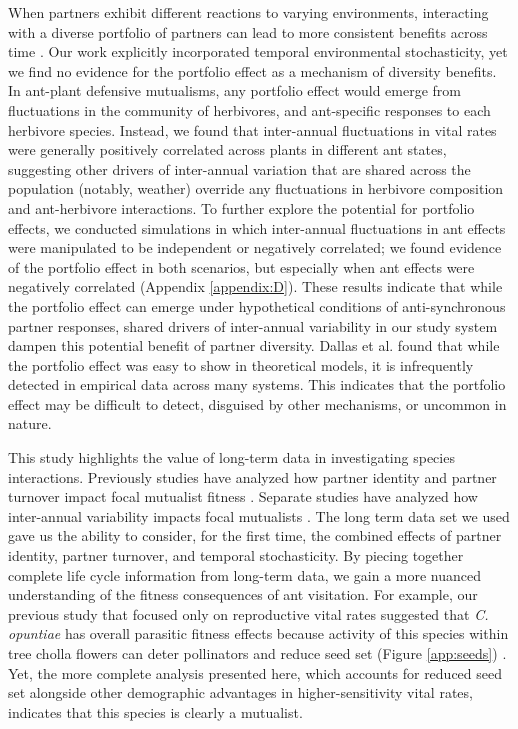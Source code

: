 \documentclass[11pt]{article}
\begin{document}
When partners exhibit different reactions to varying environments, interacting with a diverse portfolio of partners can lead to more consistent benefits across time \citep{Batstone2018}.
Our work explicitly incorporated temporal environmental stochasticity, yet we find no evidence for the portfolio effect as a mechanism of diversity benefits. 
In ant-plant defensive mutualisms, any portfolio effect would emerge from fluctuations in the community of herbivores, and ant-specific responses to each herbivore species. 
Instead, we found that inter-annual fluctuations in vital rates were generally positively correlated across plants in different ant states, suggesting other drivers of inter-annual variation that are shared across the population (notably, weather) override any fluctuations in herbivore composition and ant-herbivore interactions. 
To further explore the potential for portfolio effects, we conducted simulations in which inter-annual fluctuations in ant effects were manipulated to be independent or negatively correlated; we found evidence of the portfolio effect in both scenarios, but especially when ant effects were negatively correlated (Appendix \ref{appendix:D}).
These results indicate that while the portfolio effect can emerge under hypothetical conditions of anti-synchronous partner responses, shared drivers of inter-annual variability in our study system dampen this potential benefit of partner diversity. 
Dallas et al. \citeyear{dallas2022temporal} found that while the portfolio effect was easy to show in theoretical models, it is infrequently detected in empirical data across many systems. 
This indicates that the portfolio effect may be difficult to detect, disguised by other mechanisms, or uncommon in nature. 

This study highlights the value of long-term data in investigating species interactions. 
Previously studies have analyzed how partner identity and partner turnover impact focal mutualist fitness \citep{Fonseca2003, Dejean2008, Noe1994, Barrett2015, Bruna2014, Trojelsgaard2015}.
Separate studies have analyzed how inter-annual variability impacts focal mutualists \citep{Alonso1998, Alarcon2008, Ollerton2006, Horvitz1990, Lazaro2022}.
The long term data set we used gave us the ability to consider, for the first time, the combined effects of partner identity, partner turnover, and temporal stochasticity. 
By piecing together complete life cycle information from long-term data, we gain a more nuanced understanding of the fitness consequences of ant visitation. 
For example, our previous study that focused only on reproductive vital rates suggested that \textit{C. opuntiae} has overall parasitic fitness effects because activity of this species within tree cholla flowers can deter pollinators and reduce seed set (Figure \ref{app:seeds}) \citep{Ohm2014}.
Yet, the more complete analysis presented here, which accounts for reduced seed set alongside other demographic advantages in higher-sensitivity vital rates, indicates that this species is clearly a mutualist. 
\end{document}
